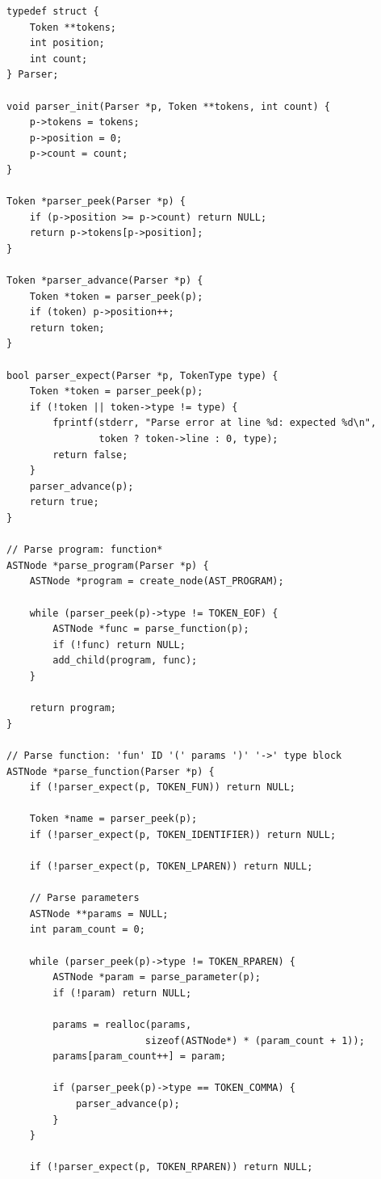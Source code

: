 \documentclass[12pt,a4paper,oneside]{book}
\begin{document}
\begin{lstlisting}[style=c, caption={Recursive Descent Parser}]
typedef struct {
    Token **tokens;
    int position;
    int count;
} Parser;

void parser_init(Parser *p, Token **tokens, int count) {
    p->tokens = tokens;
    p->position = 0;
    p->count = count;
}

Token *parser_peek(Parser *p) {
    if (p->position >= p->count) return NULL;
    return p->tokens[p->position];
}

Token *parser_advance(Parser *p) {
    Token *token = parser_peek(p);
    if (token) p->position++;
    return token;
}

bool parser_expect(Parser *p, TokenType type) {
    Token *token = parser_peek(p);
    if (!token || token->type != type) {
        fprintf(stderr, "Parse error at line %d: expected %d\n",
                token ? token->line : 0, type);
        return false;
    }
    parser_advance(p);
    return true;
}

// Parse program: function*
ASTNode *parse_program(Parser *p) {
    ASTNode *program = create_node(AST_PROGRAM);
    
    while (parser_peek(p)->type != TOKEN_EOF) {
        ASTNode *func = parse_function(p);
        if (!func) return NULL;
        add_child(program, func);
    }
    
    return program;
}

// Parse function: 'fun' ID '(' params ')' '->' type block
ASTNode *parse_function(Parser *p) {
    if (!parser_expect(p, TOKEN_FUN)) return NULL;
    
    Token *name = parser_peek(p);
    if (!parser_expect(p, TOKEN_IDENTIFIER)) return NULL;
    
    if (!parser_expect(p, TOKEN_LPAREN)) return NULL;
    
    // Parse parameters
    ASTNode **params = NULL;
    int param_count = 0;
    
    while (parser_peek(p)->type != TOKEN_RPAREN) {
        ASTNode *param = parse_parameter(p);
        if (!param) return NULL;
        
        params = realloc(params, 
                        sizeof(ASTNode*) * (param_count + 1));
        params[param_count++] = param;
        
        if (parser_peek(p)->type == TOKEN_COMMA) {
            parser_advance(p);
        }
    }
    
    if (!parser_expect(p, TOKEN_RPAREN)) return NULL;
    

\end{lstlisting}
\end{document}
